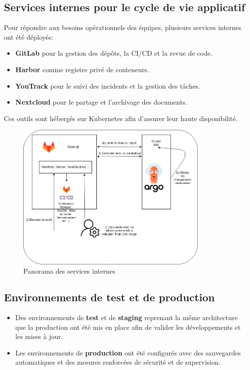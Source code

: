 \subsection{Services internes pour le cycle de vie applicatif}

Pour répondre aux besoins opérationnels des équipes, plusieurs services internes ont été déployés:
\begin{itemize}
	\item \textbf{GitLab} pour la gestion des dépôts, la CI/CD et la revue de code.
	\item \textbf{Harbor} comme registre privé de conteneurs.
	\item \textbf{YouTrack} pour le suivi des incidents et la gestion des tâches.
	\item \textbf{Nextcloud} pour le partage et l’archivage des documents.
\end{itemize}

Ces outils sont hébergés sur Kubernetes afin d’assurer leur haute disponibilité.

\begin{figure}[H]
	\centering
	\includegraphics[width=0.85\textwidth]{figures/services-internes.png}
	\caption{Panorama des services internes}
\end{figure}

\subsection{Environnements de test et de production}

\begin{itemize}
	\item Des environnements de \textbf{test} et de \textbf{staging} reprenant la même architecture que la production ont été mis en place afin de valider les développements et les mises à jour.
	\item Les environnements de \textbf{production} ont été configurés avec des sauvegardes automatiques et des mesures renforcées de sécurité et de supervision.
\end{itemize}

